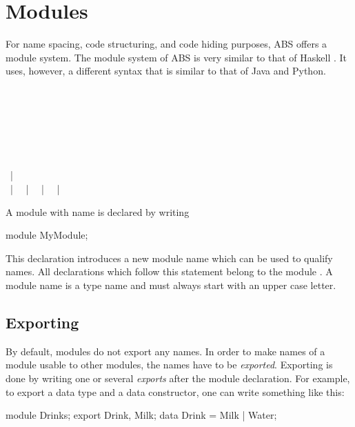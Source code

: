 \chapter{Modules}\label{sec:modules}
For name spacing, code structuring, and code hiding purposes, ABS offers a module system.
The module system of ABS is very similar to that of Haskell \cite{Haskell98}.
It uses, however, a different syntax that is similar to that of Java \cite{gosling96} and Python.

\begin{abssyntax}
   {}\ \ \TRS{;}\ \ \ \ \\
   {}\ \\
   {}\ \\
       {}\ \ \ \TRS{;}
             {}\ \TRS{*}\ \ \TRS{;}\\
       {}\ \ \ \TRS{;}
             {}\ \TRS{*}\ \ \ \TRS{;}\\
  {}\ \\
      {} ~|~ \\
         {} ~|~  ~|~ 
                 ~|~  ~|~ 
\end{abssyntax}


A module with name  is declared by writing 
\begin{abscode}
module MyModule;
\end{abscode}
This declaration introduces a new module name  which can be
used to qualify names.
All declarations which follow this statement belong to the module .
A module name is a type name and must always start with an upper case letter.

\section{Exporting}
By default, modules do not export any names.
In order to make names of a module usable to other modules, the names have to be \emph{exported}.
Exporting is done by writing one or several \emph{exports} after the module declaration.
For example, to export a data type and a data constructor, one can write something like this:
\begin{abscode}
module Drinks;
export Drink, Milk;
data Drink = Milk | Water;
\end{abscode}

